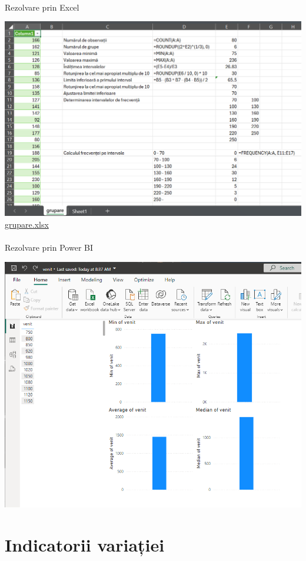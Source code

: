 \documentclass[
  11pt,
  b5paper,
  nottoc]{book}
\makeatletter
\let\oldparagraph\paragraph
\renewcommand{\paragraph}{
    \@ifstar
      \xxxParagraphStar
      \xxxParagraphNoStar
  }
\newcommand{\xxxParagraphStar}[1]{\oldparagraph*{#1}\mbox{}}
\newcommand{\xxxParagraphNoStar}[1]{\oldparagraph{#1}\mbox{}}
\makeatother
\begin{document}
\paragraph{Rezolvare prin Excel}\label{rezolvare-prin-excel-1}

\includegraphics{date/grupare.PNG}
\href{date/grupare.xlsx}{grupare.xlsx}

\paragraph{Rezolvare prin Power BI}\label{rezolvare-prin-power-bi-1}

\includegraphics{date/medie_simpla_Pbi.png}

\section{Indicatorii variației}\label{indicatorii-variaux21biei}
\end{document}
